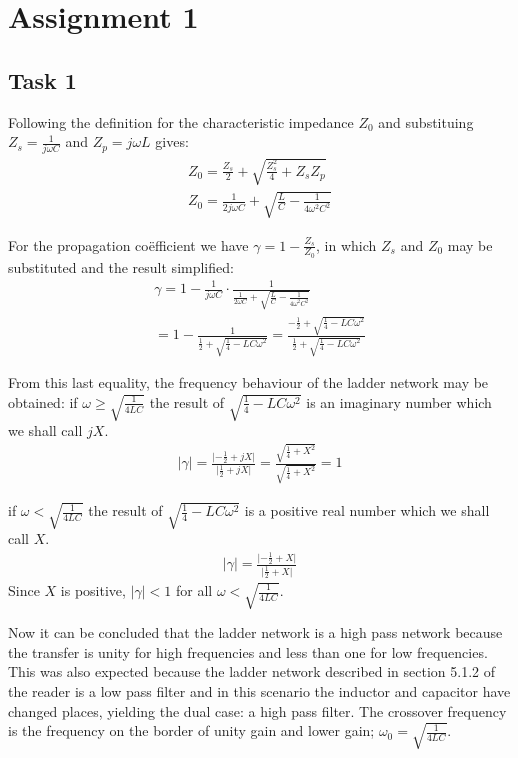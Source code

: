 \documentclass[11pt,titlepage]{report}
\begin{document}
\chapter{Assignment 1}
\section{Task 1}

Following the definition for the characteristic impedance $Z_0$ and substituing $Z_s=\frac{1}{j\omega C}$ and $Z_p=j\omega L$ gives:
\begin{eqnarray}
Z_0=\frac{Z_s}{2} + \sqrt{\frac{Z_s^2}{4}+Z_sZ_p} \\
Z_0 = \frac{1}{2j\omega C} + \sqrt{\frac{L}{C}-\frac{1}{4\omega^2C^2}} 
\end{eqnarray}

For the propagation co\"efficient we have $\gamma = 1-\frac{Z_s}{Z_0}$, in which $Z_s$ and $Z_0$ may be substituted and the result simplified:
\begin{eqnarray}
\gamma = 1 - \frac{1}{j\omega C}\cdot\frac{1}{\frac{1}{2\omega C}+\sqrt{\frac{L}{C}-\frac{1}{4\omega^2C^2}}} \\
= 1 - \frac{1}{\frac{1}{2}+\sqrt{\frac{1}{4}-LC\omega^2}} = \frac{-\frac{1}{2}+\sqrt{\frac{1}{4}-LC\omega^2}}{\frac{1}{2}+\sqrt{\frac{1}{4}-LC\omega^2}}
\end{eqnarray}

From this last equality, the frequency behaviour of the ladder network may be obtained:
if $\omega\geq\sqrt{\frac{1}{4LC}}$ the result of $\sqrt{\frac{1}{4}-LC\omega^2}$ is an imaginary number which we shall call $jX$.
\begin{eqnarray}
\lvert\gamma\rvert = \frac{\lvert -\frac{1}{2}+jX \rvert}{\lvert \frac{1}{2}+jX \rvert} = \frac{\sqrt{\frac{1}{4}+X^2}}{\sqrt{\frac{1}{4}+X^2}}=1
\end{eqnarray}

if $\omega < \sqrt{\frac{1}{4LC}}$ the result of $\sqrt{\frac{1}{4}-LC\omega^2}$ is a positive real number which we shall call $X$.
\begin{eqnarray}
\lvert\gamma\rvert = \frac{\lvert -\frac{1}{2}+X \rvert}{\lvert \frac{1}{2}+X \rvert}
\end{eqnarray}
Since $X$ is positive, $\lvert\gamma\rvert < 1$ for all $\omega < \sqrt{\frac{1}{4LC}}$. 

Now it can be concluded that the ladder network is a high pass network because the transfer is unity for high frequencies and less than one for low frequencies. This was also expected because the ladder network described in section 5.1.2 of the reader is a low pass filter and in this scenario the inductor and capacitor have changed places, yielding the dual case: a high pass filter. The crossover frequency is the frequency on the border of unity gain and lower gain; $\omega_0=\sqrt{\frac{1}{4LC}}$.
\end{document}

